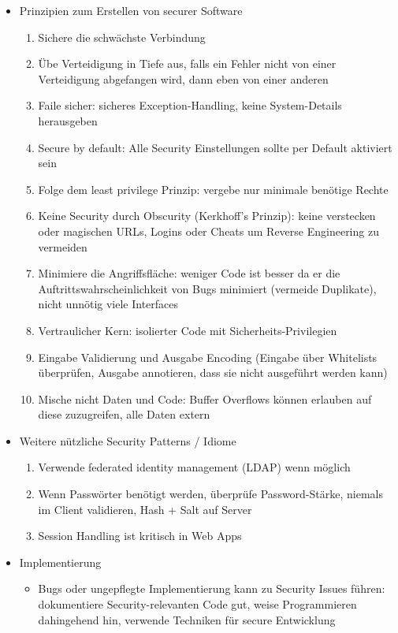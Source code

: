 \documentclass[paper=a4, fontsize=11pt]{scrartcl} %
\numberwithin{equation}{section} %
\numberwithin{figure}{section} %
\numberwithin{table}{section} %
\begin{document}
\begin{itemize}
  \item Prinzipien zum Erstellen von securer Software
  \begin{enumerate}
    \item Sichere die schwächste Verbindung
    \item Übe Verteidigung in Tiefe aus, falls ein Fehler nicht von einer Verteidigung abgefangen wird, dann eben von einer anderen
    \item Faile sicher: sicheres Exception-Handling, keine System-Details herausgeben
    \item Secure by default: Alle Security Einstellungen sollte per Default aktiviert sein
    \item Folge dem least privilege Prinzip: vergebe nur minimale benötige Rechte
    \item Keine Security durch Obscurity (Kerkhoff's Prinzip): keine verstecken oder magischen URLs, Logins oder Cheats um Reverse Engineering zu vermeiden
    \item Minimiere die Angriffsfläche: weniger Code ist besser da er die Auftrittswahrscheinlichkeit von Bugs minimiert (vermeide Duplikate), nicht unnötig viele Interfaces
    \item Vertraulicher Kern: isolierter Code mit Sicherheits-Privilegien
    \item Eingabe Validierung und Ausgabe Encoding (Eingabe über Whitelists überprüfen, Ausgabe annotieren, dass sie nicht ausgeführt werden kann)
    \item Mische nicht Daten und Code: Buffer Overflows können erlauben auf diese zuzugreifen, alle Daten extern
  \end{enumerate}
  \item Weitere nützliche Security Patterns / Idiome
  \begin{enumerate}
    \item Verwende federated identity management (LDAP) wenn möglich
    \item Wenn Passwörter benötigt werden, überprüfe Password-Stärke, niemals im Client validieren, Hash + Salt auf Server
    \item Session Handling ist kritisch in Web Apps
  \end{enumerate}
  \item Implementierung
  \begin{itemize}
    \item Bugs oder ungepflegte Implementierung kann zu Security Issues führen: dokumentiere Security-relevanten Code gut, weise Programmieren dahingehend hin, verwende Techniken für secure Entwicklung

\end{itemize}
\end{itemize}
\end{document}
